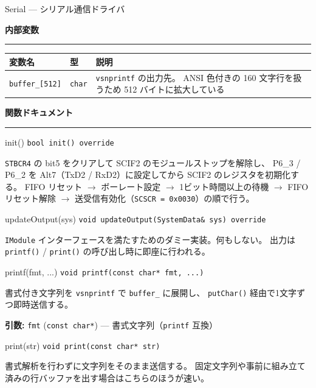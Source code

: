 \documentclass[a4paper,11pt,dvipdfmx]{jsarticle}
\makeatletter
\newcommand{\apisection}[1]{%
  \par\addvspace{4mm}%
  {\normalsize\bfseries\color{headerblue} #1}%
  \par\vspace{-1mm}%
  {\color{accentblue!40}\rule{\linewidth}{0.5pt}}%
  \par\nobreak\vspace{2mm}%
  \@afterheading
}
\makeatother
\begin{document}
\begin{apibox}{Serial --- シリアル通信ドライバ}
\apisection{内部変数}

\begin{tabularx}{\textwidth}{l l X}
\toprule
\textbf{変数名} & \textbf{型} & \textbf{説明} \\
\midrule
\texttt{buffer\_[512]} & \texttt{char} & \texttt{vsnprintf} の出力先。
  ANSI 色付きの 160 文字行を扱うため 512 バイトに拡大している \\
\bottomrule
\end{tabularx}

\apisection{関数ドキュメント}

\begin{funcblock}{init()}
\texttt{bool init() override}

\vspace{1.5mm}
\texttt{STBCR4} の bit5 をクリアして SCIF2 のモジュールストップを解除し、
P6\_3 / P6\_2 を Alt7（TxD2 / RxD2）に設定してから SCIF2 のレジスタを初期化する。
FIFO リセット $\rightarrow$ ボーレート設定 $\rightarrow$ 1ビット時間以上の待機 $\rightarrow$
FIFO リセット解除 $\rightarrow$ 送受信有効化（\texttt{SCSCR = 0x0030}）の順で行う。
\end{funcblock}

\begin{funcblock}{updateOutput(sys)}
\texttt{void updateOutput(SystemData\& sys) override}

\vspace{1.5mm}
\texttt{IModule} インターフェースを満たすためのダミー実装。何もしない。
出力は \texttt{printf()} / \texttt{print()} の呼び出し時に即座に行われる。
\end{funcblock}

\begin{funcblock}{printf(fmt, ...)}
\texttt{void printf(const char* fmt, ...)}

\vspace{1.5mm}
書式付き文字列を \texttt{vsnprintf} で \texttt{buffer\_} に展開し、
\texttt{putChar()} 経由で1文字ずつ即時送信する。

\vspace{1.5mm}
\textbf{引数:} \texttt{fmt} (\texttt{const char*}) --- 書式文字列（\texttt{printf} 互換）
\end{funcblock}

\begin{funcblock}{print(str)}
\texttt{void print(const char* str)}

\vspace{1.5mm}
書式解析を行わずに文字列をそのまま送信する。
固定文字列や事前に組み立て済みの行バッファを出す場合はこちらのほうが速い。


\end{funcblock}
\end{apibox}
\end{document}
